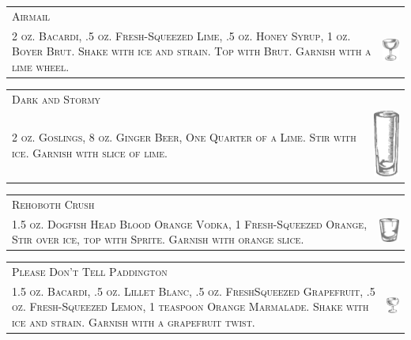 \documentclass{article}
\begin{document}
\begin{tabular}{b{2.5in} m{0.625in}}
  \multicolumn{2}{p{3.5in}}{\centering\Huge\textsc{Airmail}} \\ 
  
  \textsc{2 oz. Bacardi, .5 oz. Fresh-Squeezed Lime, .5 oz. Honey
    Syrup, 1 oz. Boyer Brut. Shake with ice and strain. Top with
    Brut. Garnish with a lime wheel.} &
  \includegraphics[width=0.5in]{egg_coupe.png}
\end{tabular}

\begin{tabular}{b{2.5in} m{0.625in}}
  \multicolumn{2}{p{3.5in}}{\centering\Huge\textsc{Dark and Stormy}} \\ 
  
  \textsc{2 oz. Goslings, 8 oz. Ginger Beer, One Quarter of a
    Lime. Stir with ice. Garnish with slice of lime.} &
  \includegraphics[width=0.5in]{collins.png}
\end{tabular}

\begin{tabular}{b{2.5in} m{0.625in}}
  \multicolumn{2}{p{3.5in}}{\centering\Huge\textsc{Rehoboth Crush}} \\ 
  
  \textsc{1.5 oz. Dogfish Head Blood Orange Vodka, 1 Fresh-Squeezed
    Orange, Stir over ice, top with Sprite. Garnish with orange
    slice.} & \includegraphics[width=0.5in]{rocks_glass.png}
\end{tabular}

\begin{tabular}{b{2.5in} m{0.625in}}
  \multicolumn{2}{p{3.5in}}{\centering\Huge\textsc{Please Don't Tell Paddington}} \\ 
  
  \textsc{1.5 oz. Bacardi, .5 oz. Lillet Blanc, .5 oz. FreshSqueezed
    Grapefruit, .5 oz. Fresh-Squeezed Lemon, 1 teaspoon Orange
    Marmalade. Shake with ice and strain. Garnish with a grapefruit
    twist.} & \includegraphics[width=0.5in]{coupe.png}
\end{tabular}
\end{document}
